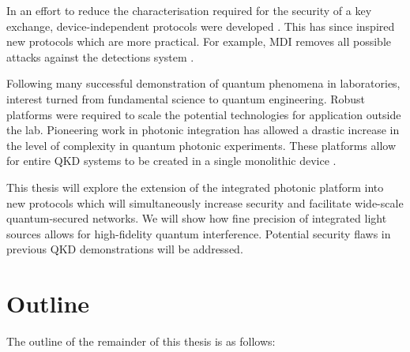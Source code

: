 In an effort to reduce the characterisation required for the security of a key exchange, device-independent protocols were developed \cite{Mayers1998}. This has since inspired new protocols which are more practical. For example, \ac{MDI} removes all possible attacks against the detections system \cite{mdi-qkd}. 

Following many successful demonstration of quantum phenomena in laboratories, interest turned from fundamental science to quantum engineering. Robust platforms were required to scale the potential technologies for application outside the lab. Pioneering work in photonic integration has allowed a drastic increase in the level of complexity in quantum photonic experiments. These platforms allow for entire \ac{QKD} systems to be created in a single monolithic device \cite{Sibson2017InP}.



This thesis will explore the extension of the integrated photonic platform into new protocols which will simultaneously increase security and facilitate wide-scale quantum-secured networks. We will show how fine precision of integrated light sources allows for high-fidelity quantum interference. Potential security flaws in previous \ac{QKD} demonstrations will be addressed. 


\clearpage
\newpage
\section{Outline}

The outline of the remainder of this thesis is as follows:

